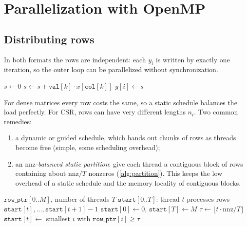 \documentclass[11pt,a4paper]{article}
\newcommand{\id}[1]{\texttt{#1}}
\newcommand{\nnz}{\mathrm{nnz}}
\begin{document}
\section{Parallelization with OpenMP}

\subsection{Distributing rows}

In both formats the rows are independent: each $y_i$ is written by exactly one
iteration, so the outer loop can be parallelized without synchronization.

\begin{algorithm}[H]
\caption{Parallel CSR $y = Ax$ (one row per iteration)}
\label{alg:csr-par}
\begin{algorithmic}[1]
 
  \State $s \gets 0$
  \For{$k \gets \id{row\_ptr}[i]$ \textbf{to} $\id{row\_ptr}[i+1]-1$}
    \State $s \gets s + \id{val}[k] \cdot x[\id{col}[k]]$
  \EndFor
  \State $y[i] \gets s$
\EndFor
\end{algorithmic}
\end{algorithm}

\noindent For dense matrices every row costs the same, so a static schedule
balances the load perfectly. For CSR, rows can have very different lengths
$n_i$. Two common remedies:
\begin{enumerate}
  \item a dynamic or guided schedule, which hands out chunks of rows as
        threads become free (simple, some scheduling overhead);
  \item an \emph{$\nnz$-balanced static partition}: give each thread a
        contiguous block of rows containing about $\nnz/T$ nonzeros
        (\cref{alg:partition}). This keeps the low overhead of a static
        schedule and the memory locality of contiguous blocks.
\end{enumerate}

\begin{algorithm}[H]
\caption{$\nnz$-balanced row partition for $T$ threads}
\label{alg:partition}
\begin{algorithmic}[1]
\Require $\id{row\_ptr}[0..M]$, number of threads $T$
\Ensure $\id{start}[0..T]$: thread $t$ processes rows $\id{start}[t], \dots, \id{start}[t+1]-1$
\State $\id{start}[0] \gets 0$, \quad $\id{start}[T] \gets M$
  \State $\tau \gets \lfloor t \cdot \nnz / T \rfloor$
  \State $\id{start}[t] \gets$ smallest $i$ with $\id{row\_ptr}[i] \ge \tau$ 
\EndFor
\end{algorithmic}
\end{algorithm}
\end{document}
